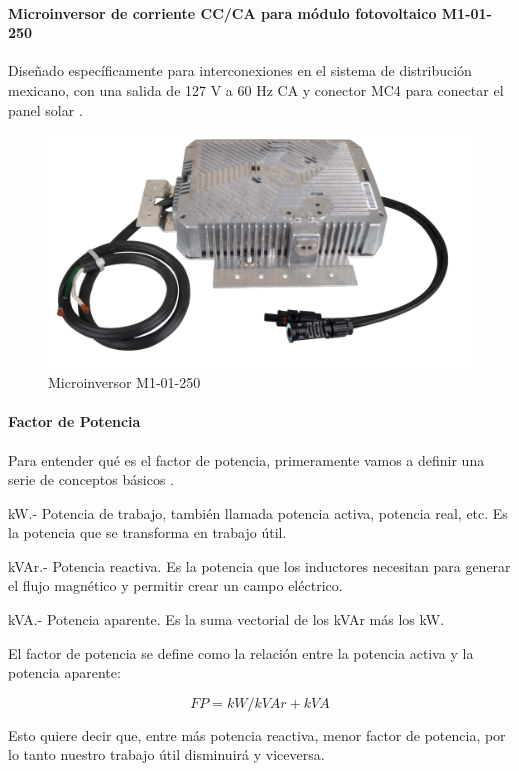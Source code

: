 \paragraph{Microinversor de corriente CC/CA para módulo fotovoltaico M1-01-250}
Diseñado específicamente para interconexiones en el sistema de distribución mexicano, con una salida de 127 V a 60 Hz CA y conector MC4 para conectar el panel solar \citep{MarcoTeorico3}.

\begin{figure}[H]
	\centering
	\includegraphics[scale=.20]{Capitulo2/images/microinversor.png}
	\caption{Microinversor M1-01-250}
	\label{fig:diagrama_dispensador}
\end{figure}


\paragraph{Factor de Potencia}

Para entender qué es el factor de potencia, primeramente vamos a definir una serie de conceptos básicos \citep{FP}.

kW.- Potencia de trabajo, también llamada potencia activa, potencia real, etc. Es la potencia que se transforma en trabajo útil.

kVAr.- Potencia reactiva. Es la potencia que los inductores necesitan para generar el flujo magnético y permitir crear un campo eléctrico.

kVA.- Potencia aparente. Es la suma vectorial de los kVAr más los kW.
 
El factor de potencia se define como la relación entre la potencia activa y la potencia aparente:

\[ FP = kW / kVAr + kVA \]

Esto quiere decir que, entre más potencia reactiva, menor factor de potencia, por lo tanto nuestro trabajo útil disminuirá y viceversa.\\

